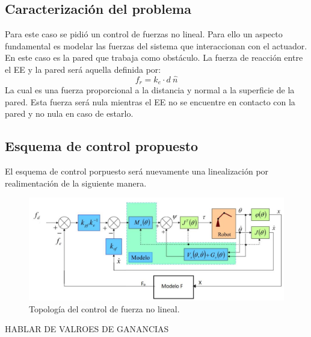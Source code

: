 %

%

\subsection{Caracterizaci\'on del problema}
Para este caso se pidi\'o un control de fuerzas no lineal. Para ello un aspecto fundamental es modelar las fuerzas del sistema que interaccionan con el actuador.
En este caso es la pared que trabaja como obst\'aculo. La fuerza de reacci\'on entre el EE y la pared ser\'a aquella definida por:
\begin{equation}
f_r = k_e \cdot d \ \hat{n}
\end{equation}
La cual es una fuerza proporcional a la distancia y normal a la superficie de la pared.
Esta fuerza  ser\'a nula mientras el EE no se encuentre en contacto con la pared y no nula en caso de estarlo.

\subsection{Esquema de control propuesto}
El esquema de control porpuesto ser\'a nuevamente una linealizaci\'on por realimentaci\'on de la siguiente manera.
\begin{figure}[H]
	\centering
	\includegraphics[width=0.8\linewidth]{ImagenesControl de fuerza no lineal/controlf}
	\caption{Topolog\'ia del control de fuerza no lineal.}	
	\label{fig:control_f_modelo}
\end{figure}


HABLAR DE VALROES DE GANANCIAS
